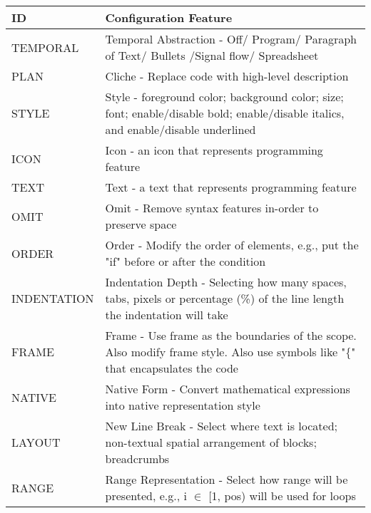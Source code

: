 \begin{table}[H]
\centering
\begin{tabular}{|l|p{14cm}|}
\hline
\textbf{ID}  & \textbf{Configuration Feature}                                                                                            		  \\ \hline
TEMPORAL     & Temporal Abstraction - Off/ Program/ Paragraph of Text/ Bullets /Signal flow/ Spreadsheet                                          \\ \hline
PLAN         & Cliche - Replace code with high-level description                                                                                  \\ \hline
STYLE        & Style - foreground color; background color; size; font; enable/disable bold; enable/disable italics, and enable/disable underlined \\ \hline
ICON         & Icon - an icon that represents programming feature                                                                                 \\ \hline
TEXT         & Text - a text that represents programming feature                                                                                  \\ \hline
OMIT         & Omit - Remove syntax features in-order to preserve space                                                                           \\ \hline
ORDER        & Order - Modify the order of elements, e.g., put the "if" before or after the condition                                             \\ \hline
INDENTATION  & Indentation Depth - Selecting how many spaces, tabs, pixels or percentage (\%) of the line length the indentation will take        \\ \hline
FRAME        & Frame - Use frame as the boundaries of the scope. Also modify frame style. Also use symbols like "\{" that encapsulates the code   \\ \hline
NATIVE       & Native Form - Convert mathematical expressions into native representation style                                                    \\ \hline
LAYOUT       & New Line Break - Select where text is located; non-textual spatial arrangement of blocks; breadcrumbs                              \\ \hline
RANGE        & Range Representation - Select how range will be presented, e.g., i $ \in $ {[}1, pos) will be used for loops                       \\ \hline

\end{tabular}
\end{table}
